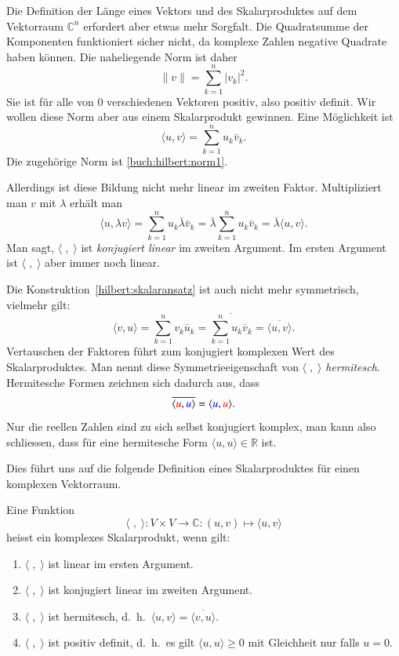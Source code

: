 Die Definition der Länge eines Vektors und des Skalarproduktes auf dem
Vektorraum $\mathbb C^n$ erfordert aber etwas mehr Sorgfalt.
Die Quadratsumme der Komponenten funktioniert sicher nicht, da komplexe
Zahlen negative Quadrate haben können.
Die naheliegende Norm ist daher
\begin{equation}
\|v\| = \sum_{k=1}^n |v_k|^2.
\label{buch:hilbert:norm1}
\end{equation}
Sie ist für alle von $0$ verschiedenen Vektoren positiv, also positiv
definit.
Wir wollen diese Norm aber aus einem Skalarprodukt gewinnen.
Eine Möglichkeit ist
\begin{equation}
\langle u,v\rangle = \sum_{k=1}^n u_k\bar{v}_k.
\label{hilbert:skalaransatz}
\end{equation}
Die zugehörige Norm ist \eqref{buch:hilbert:norm1}.

Allerdings ist diese Bildung nicht mehr linear im zweiten Faktor.
Multipliziert man $v$ mit $\lambda$ erhält man
\[
\langle u,\lambda v\rangle
=
\sum_{k=1}^n u_k\bar{\lambda} \bar{v}_k
=
\bar{\lambda}\sum_{k=1}^n u_k\bar{v}_k
=
\bar{\lambda}\langle u,v\rangle.
\]
Man sagt, $\langle\;,\;\rangle$ ist {\em konjugiert linear} im zweiten Argument.
Im ersten Argument ist $\langle\;,\;\rangle$ aber immer noch linear.

Die Konstruktion~\eqref{hilbert:skalaransatz} ist auch nicht mehr
symmetrisch, vielmehr gilt:
\[
\langle v,u\rangle
=
\sum_{k=1}^n v_k\bar{u}_k
=
\overline{\sum_{k=1}^n u_k\bar{v}_k}
=
\overline{\langle u,v\rangle}.
\]
Vertauschen der Faktoren führt zum konjugiert komplexen Wert des
Skalarproduktes.
Man nennt diese Symmetrieeigenschaft von $\langle\;,\;\rangle$
{\em hermitesch}.
Hermitesche Formen zeichnen sich dadurch aus, dass
\[
\overline{\langle {\color{red}u},{\color{blue}u}\rangle}
=
\langle {\color{blue}u},{\color{red}u}\rangle.
\]
Nur die reellen Zahlen sind zu sich selbst konjugiert komplex, man kann
also schliessen, dass für eine hermitesche Form
$\langle u,u\rangle\in\mathbb R$ ist.

Dies führt uns auf die folgende Definition eines Skalarproduktes für einen
komplexen Vektorraum.
\begin{definition}
Eine Funktion
\[
\langle\;,\;\rangle
\colon V\times V\to \mathbb C : (u,v) \mapsto \langle u,v\rangle
\]
heisst ein komplexes Skalarprodukt, wenn gilt:
\begin{enumerate}
\item $\langle \;,\;\rangle$ ist linear im ersten Argument.
\item $\langle \;,\;\rangle$ ist konjugiert linear im zweiten Argument.
\item $\langle\;,\;\rangle$ ist hermitesch,
d.~h.~$\langle u,v\rangle=\overline{\langle v,u\rangle}$.
\item $\langle \;,\;\rangle$ ist positiv definit, d.~h.~es gilt
$\langle u,u\rangle \ge 0$ mit Gleichheit nur falls $u=0$.
\end{enumerate}
\end{definition}

